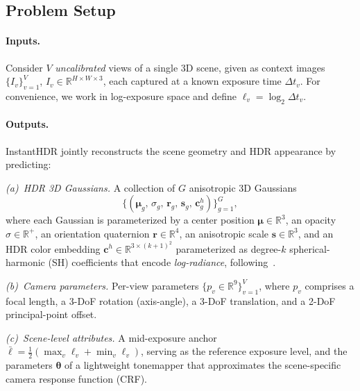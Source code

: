 \documentclass[runningheads]{llncs}
\begin{document}
\subsection{Problem Setup}
\label{sec:setup}

\paragraph{\textbf{Inputs.}}
Consider $V$ \emph{uncalibrated} views of a single 3D scene, given as context images $\{I_v\}_{v=1}^{V}$, $I_v \in \mathbb{R}^{H \times W \times 3}$, each captured at a known exposure time $\Delta t_v$.
For convenience, we work in log-exposure space and define $\ell_v = \log_2 \Delta t_v$.

\paragraph{\textbf{Outputs.}}
InstantHDR jointly reconstructs the scene geometry and HDR appearance by predicting:

\noindent
\emph{(a)~HDR 3D Gaussians.}
A collection of $G$ anisotropic 3D Gaussians
\begin{equation}
    \bigl\{(\boldsymbol{\mu}_g,\, \sigma_g,\, \boldsymbol{r}_g,\, \boldsymbol{s}_g,\, \boldsymbol{c}_g^{h})\bigr\}_{g=1}^{G},
\end{equation}
where each Gaussian is parameterized by a center position $\boldsymbol{\mu} \in \mathbb{R}^{3}$, an opacity $\sigma \in \mathbb{R}^{+}$, an orientation quaternion $\boldsymbol{r} \in \mathbb{R}^{4}$, an anisotropic scale $\boldsymbol{s} \in \mathbb{R}^{3}$, and an HDR color embedding $\boldsymbol{c}^{h} \in \mathbb{R}^{3 \times (k{+}1)^{2}}$ parameterized as degree-$k$ spherical-harmonic (SH) coefficients that encode \emph{log-radiance}, following~\cite{liu2025gausshdr,cai2024hdr}.

\noindent
\emph{(b)~Camera parameters.}
Per-view parameters $\{p_v \in \mathbb{R}^{9}\}_{v=1}^{V}$, where $p_v$ comprises a focal length, a 3-DoF rotation (axis-angle), a 3-DoF translation, and a 2-DoF principal-point offset.

\noindent
\emph{(c)~Scene-level attributes.}
A mid-exposure anchor $\bar{\ell} = \tfrac{1}{2}(\max_v \ell_v + \min_v \ell_v)$, serving as the reference exposure level, and the parameters $\boldsymbol{\theta}$ of a lightweight tonemapper that approximates the scene-specific camera response function (CRF).
\end{document}
